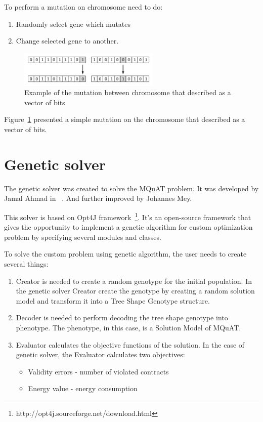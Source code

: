 To perform a mutation on chromosome need to do:

\begin{enumerate}
	\item Randomly select gene which mutates
	\item Change selected gene to another.
\end{enumerate}

\begin{figure}
	\centering
	\includegraphics[width=0.6\textwidth]{images/mutationVector.pdf}
	\caption[Example of the mutation]{Example of the mutation between chromosome that described as a vector of bits}
	\label{fig:MutationVector}
\end{figure}

Figure~\ref{fig:MutationVector} presented a simple mutation on the chromosome that described as a vector of bits.




\section{Genetic solver}\label{sec:GeneticSolver}
The genetic solver was created to solve the MQuAT problem. It was developed by Jamal Ahmad in ~\cite{ahmad18}. And further improved by Johannes Mey.

This solver is based on Opt4J framework~\footnote{http://opt4j.sourceforge.net/download.html}. It's an open-source framework that gives the opportunity to implement a genetic algorithm for custom optimization problem by specifying several modules and classes.

To solve the custom problem using genetic algorithm, the user needs to create several things:

\begin{enumerate}
	\item Creator is needed to create a random genotype for the initial population.
	In the genetic solver Creator create the genotype by creating a random solution model and transform it into a Tree Shape Genotype structure.
	\item Decoder is needed to perform decoding the tree shape genotype into phenotype. The phenotype, in this case, is a Solution Model of MQuAT.
	\item Evaluator calculates the objective functions of the solution. In the case of genetic solver, the Evaluator calculates two objectives: 
	
	\begin{itemize}
		\item Validity errors - number of violated contracts
		\item Energy value - energy consumption
	\end{itemize}
	
\end{enumerate}


